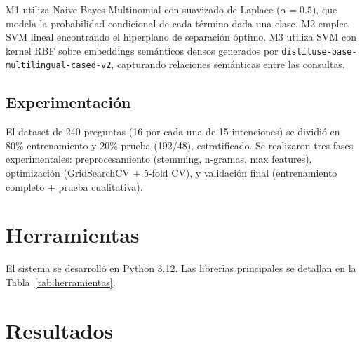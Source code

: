 \documentclass[conference, a4paper]{IEEEtran}
\begin{document}
M1 utiliza Naive Bayes Multinomial con suavizado de Laplace ($\alpha=0.5$), 
que modela la probabilidad condicional de cada t\'ermino dada una clase. 
M2 emplea SVM lineal encontrando el hiperplano de separaci\'on \'optimo. 
M3 utiliza SVM con kernel RBF sobre embeddings sem\'anticos densos 
generados por \texttt{distiluse-base-multilingual-cased-v2}, capturando 
relaciones sem\'anticas entre las consultas.

\subsection{Experimentaci\'on}

El dataset de 240 preguntas (16 por cada una de 15 intenciones) se 
dividi\'o en 80\% entrenamiento y 20\% prueba (192/48), estratificado. 
Se realizaron tres fases experimentales: preprocesamiento (stemming, 
n-gramas, max features), optimizaci\'on (GridSearchCV + 5-fold CV), 
y validaci\'on final (entrenamiento completo + prueba cualitativa).

\section{Herramientas}

El sistema se desarroll\'o en Python 3.12. Las librer\'{\i}as principales 
se detallan en la Tabla~\ref{tab:herramientas}.

\begin{table}[h!]
\centering
\caption{Librer\'{\i}as y herramientas utilizadas.}
\label{tab:herramientas}
\end{table}

\section{Resultados}
\end{document}
